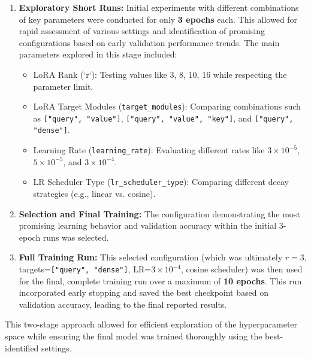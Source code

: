 \documentclass[twoside, 11pt]{article}
\begin{document}
\begin{enumerate}
    \item \textbf{Exploratory Short Runs:} Initial experiments with different combinations of key parameters were conducted for only \textbf{3 epochs} each. This allowed for rapid assessment of various settings and identification of promising configurations based on early validation performance trends. The main parameters explored in this stage included:
        \begin{itemize}[noitemsep, topsep=0pt, partopsep=0pt, parsep=0pt]
            \item LoRA Rank (`r`): Testing values like 3, 8, 10, 16 while respecting the parameter limit.
            \item LoRA Target Modules (\texttt{target\_modules}): Comparing combinations such as \texttt{["query", "value"]}, \texttt{["query", "value", "key"]}, and \texttt{["query", "dense"]}.
            \item Learning Rate (\texttt{learning\_rate}): Evaluating different rates like $3 \times 10^{-5}$, $5 \times 10^{-5}$, and $3 \times 10^{-4}$.
            \item LR Scheduler Type (\texttt{lr\_scheduler\_type}): Comparing different decay strategies (e.g., linear vs. cosine).
        \end{itemize}
    \item \textbf{Selection and Final Training:} The configuration demonstrating the most promising learning behavior and validation accuracy within the initial 3-epoch runs was selected.
    \item \textbf{Full Training Run:} This selected configuration (which was ultimately $r=3$, targets=\texttt{["query", "dense"]}, LR=$3 \times 10^{-4}$, cosine scheduler) was then used for the final, complete training run over a maximum of \textbf{10 epochs}. This run incorporated early stopping and saved the best checkpoint based on validation accuracy, leading to the final reported results.
\end{enumerate}
This two-stage approach allowed for efficient exploration of the hyperparameter space while ensuring the final model was trained thoroughly using the best-identified settings.
\end{document}
